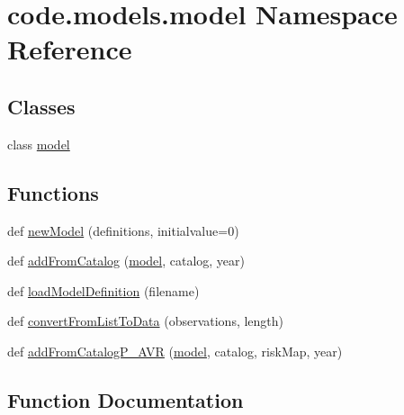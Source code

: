 \hypertarget{namespacecode_1_1models_1_1model}{}\section{code.\+models.\+model Namespace Reference}
\label{namespacecode_1_1models_1_1model}
\subsection*{Classes}
\begin{DoxyCompactItemize}
\item 
class \hyperlink{classcode_1_1models_1_1model_1_1model}{model}
\end{DoxyCompactItemize}
\subsection*{Functions}
\begin{DoxyCompactItemize}
\item 
def \hyperlink{namespacecode_1_1models_1_1model_ad4cd9f5c3ee9cb21283e98f1dcd9d81b}{new\+Model} (definitions, initialvalue=0)
\item 
def \hyperlink{namespacecode_1_1models_1_1model_aa5b70c0dbb95cdcca3fae1082f4b4a93}{add\+From\+Catalog} (\hyperlink{classcode_1_1models_1_1model_1_1model}{model}, catalog, year)
\item 
def \hyperlink{namespacecode_1_1models_1_1model_a516aba6a18e97e9ca010b3b8ce66d033}{load\+Model\+Definition} (filename)
\item 
def \hyperlink{namespacecode_1_1models_1_1model_aff45090e2bdcb7f7a6dcc6ae34007cb2}{convert\+From\+List\+To\+Data} (observations, length)
\item 
def \hyperlink{namespacecode_1_1models_1_1model_ad191be2a9a695565c7e247a98bb0a795}{add\+From\+Catalog\+P\+\_\+\+A\+VR} (\hyperlink{classcode_1_1models_1_1model_1_1model}{model}, catalog, risk\+Map, year)
\end{DoxyCompactItemize}


\subsection{Function Documentation}
\mbox{\label{namespacecode_1_1models_1_1model_aa5b70c0dbb95cdcca3fae1082f4b4a93}} 

